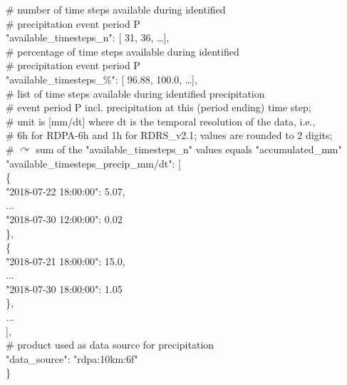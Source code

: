 \documentclass[10pt,a4paper,titlepage,parskip]{scrartcl}
\newenvironment{ttfont}{\fontfamily{\ttdefault}\selectfont}{\par}
\newcommand{\GRAU}[1]{\textcolor{ufzgray2}{#1}}
\begin{document}
\begin{framed}
\begin{ttfont}
\begin{tabbing}
			\> \GRAU{\# number of time steps available during identified }\\
			\> \GRAU{\# precipitation event period P}\\
			\> "available\_timesteps\_n": [ 31, 36, \ldots ],  \\
			\> \GRAU{\# percentage of time steps available during identified }\\
			\> \GRAU{\# precipitation event period P}\\
			\> "available\_timesteps\_\%": [ 96.88, 100.0, \ldots ], \\
			\> \GRAU{\# list of time steps available during identified precipitation}\\
			\> \GRAU{\# event period P incl. precipitation at this (period ending) time step; }\\
			\> \GRAU{\# unit is [mm/dt] where dt is the temporal resolution of the data, i.e.,}\\
			\> \GRAU{\# 6h for RDPA-6h and 1h for RDRS\_v2.1; values are rounded to 2 digits;}\\
			\> \GRAU{\# $\curvearrowright$ sum of the "available\_timesteps\_n" values equals "accumulated\_mm"}\\
			\> "available\_timesteps\_precip\_mm/dt": [ \\
			\> \> \{ \\
			\> \> \>	"2018-07-22 18:00:00": 5.07,  \\
			\> \> \> 	...  \\
			\> \> \> 	"2018-07-30 12:00:00": 0.02  \\
			\> \> \},  \\
			\> \> \{ \\
			\> \> \>	"2018-07-21 18:00:00": 15.0,  \\
			\> \> \> 	...  \\
			\> \> \>	"2018-07-30 18:00:00": 1.05  \\
			\> \> \},  \\
			\> \> 	...  \\
			\> \> ],  \\
			\> \GRAU{\# product used as data source for precipitation}\\
			\> "data\_source": "rdpa:10km:6f" \\
			\} \\
		\end{tabbing}
	\end{ttfont}
	\vspace*{-0.3cm}
\end{framed}
\vspace*{-0.3cm}
\end{document}
